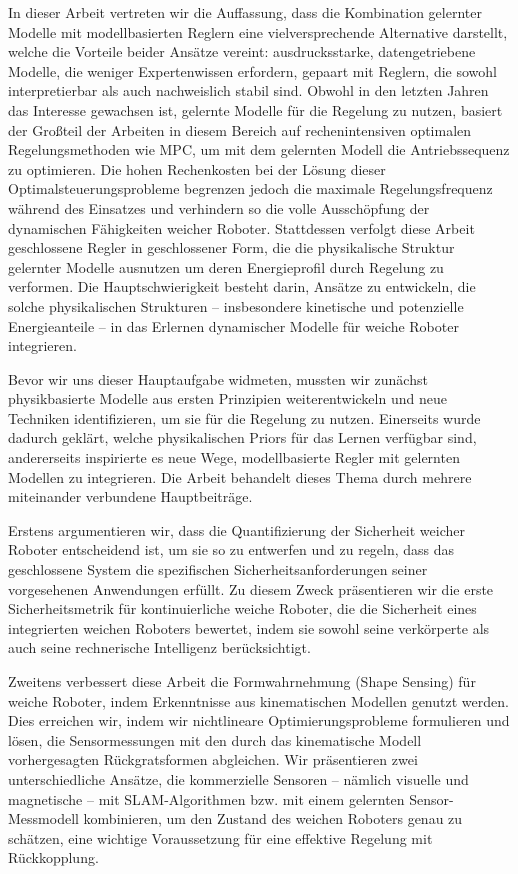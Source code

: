 {In dieser Arbeit vertreten wir die Auffassung, dass die Kombination gelernter Modelle mit modellbasierten Reglern eine vielversprechende Alternative darstellt, welche die Vorteile beider Ansätze vereint: ausdrucksstarke, datengetriebene Modelle, die weniger Expertenwissen erfordern, gepaart mit Reglern, die sowohl interpretierbar als auch nachweislich stabil sind. Obwohl in den letzten Jahren das Interesse gewachsen ist, gelernte Modelle für die Regelung zu nutzen, basiert der Großteil der Arbeiten in diesem Bereich auf rechenintensiven optimalen Regelungsmethoden wie MPC, um mit dem gelernten Modell die Antriebssequenz zu optimieren. Die hohen Rechenkosten bei der Lösung dieser Optimalsteuerungsprobleme begrenzen jedoch die maximale Regelungsfrequenz während des Einsatzes und verhindern so die volle Ausschöpfung der dynamischen Fähigkeiten weicher Roboter. Stattdessen verfolgt diese Arbeit geschlossene Regler in geschlossener Form, die die physikalische Struktur gelernter Modelle ausnutzen um deren Energieprofil durch Regelung zu verformen. Die Hauptschwierigkeit besteht darin, Ansätze zu entwickeln, die solche physikalischen Strukturen – insbesondere kinetische und potenzielle Energieanteile – in das Erlernen dynamischer Modelle für weiche Roboter integrieren.

Bevor wir uns dieser Hauptaufgabe widmeten, mussten wir zunächst physikbasierte Modelle aus ersten Prinzipien weiterentwickeln und neue Techniken identifizieren, um sie für die Regelung zu nutzen. Einerseits wurde dadurch geklärt, welche physikalischen Priors für das Lernen verfügbar sind, andererseits inspirierte es neue Wege, modellbasierte Regler mit gelernten Modellen zu integrieren. Die Arbeit behandelt dieses Thema durch mehrere miteinander verbundene Hauptbeiträge.

Erstens argumentieren wir, dass die Quantifizierung der Sicherheit weicher Roboter entscheidend ist, um sie so zu entwerfen und zu regeln, dass das geschlossene System die spezifischen Sicherheitsanforderungen seiner vorgesehenen Anwendungen erfüllt. Zu diesem Zweck präsentieren wir die erste Sicherheitsmetrik für kontinuierliche weiche Roboter, die die Sicherheit eines integrierten weichen Roboters bewertet, indem sie sowohl seine verkörperte als auch seine rechnerische Intelligenz berücksichtigt.

Zweitens verbessert diese Arbeit die Formwahrnehmung (Shape Sensing) für weiche Roboter, indem Erkenntnisse aus kinematischen Modellen genutzt werden. Dies erreichen wir, indem wir nichtlineare Optimierungsprobleme formulieren und lösen, die Sensormessungen mit den durch das kinematische Modell vorhergesagten Rückgratsformen abgleichen. Wir präsentieren zwei unterschiedliche Ansätze, die kommerzielle Sensoren – nämlich visuelle und magnetische – mit SLAM-Algorithmen bzw. mit einem gelernten Sensor-Messmodell kombinieren, um den Zustand des weichen Roboters genau zu schätzen, eine wichtige Voraussetzung für eine effektive Regelung mit Rückkopplung.

}
